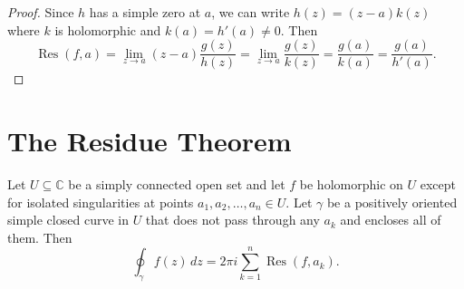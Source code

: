 \begin{proof}
  Since $h$ has a simple zero at $a$, we can write $h(z) = (z - a) k(z)$ where $k$ is holomorphic and $k(a) = h'(a) \neq 0$. Then
  \[
    \operatorname{Res}(f, a) = \lim_{z \to a} (z - a) \frac{g(z)}{h(z)} = \lim_{z \to a} \frac{g(z)}{k(z)} = \frac{g(a)}{k(a)} = \frac{g(a)}{h'(a)}.
  \]
\end{proof}

\section{The Residue Theorem}

\begin{theorem}
  Let $U \subseteq \mathbb{C}$ be a simply connected open set and let $f$ be holomorphic on $U$ except for isolated singularities at points $a_1, a_2, \ldots, a_n \in U$.
  Let $\gamma$ be a positively oriented simple closed curve in $U$ that does not pass through any $a_k$ and encloses all of them. Then
  \begin{equation}
    \oint_{\gamma} f(z) \, dz = 2\pi i \sum_{k=1}^{n} \operatorname{Res}(f, a_k).
  \end{equation}
\end{theorem}

